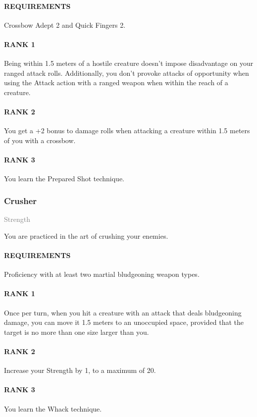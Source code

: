 \paragraph{REQUIREMENTS} Crossbow Adept 2 and Quick Fingers 2.
\paragraph{RANK 1} Being within 1.5 meters of a hostile creature doesn't impose disadvantage on your ranged attack rolls.
Additionally, you don't provoke attacks of opportunity when using the Attack action with a ranged weapon when within the reach of a creature.
\paragraph{RANK 2} You get a +2 bonus to damage rolls when attacking a creature within 1.5 meters of you with a crossbow.
\paragraph{RANK 3} You learn the Prepared Shot technique.

\subsubsection{Crusher} \label{feat::crusher}
\small{\textcolor{gray}{Strength}}

\normalsize
You are practiced in the art of crushing your enemies.
\paragraph{REQUIREMENTS} Proficiency with at least two martial bludgeoning weapon types.
\paragraph{RANK 1} Once per turn, when you hit a creature with an attack that deals bludgeoning damage, you can move it 1.5 meters to an unoccupied space, provided that the target is no more than one size larger than you.
\paragraph{RANK 2} Increase your Strength by 1, to a maximum of 20.
\paragraph{RANK 3} You learn the Whack technique.

